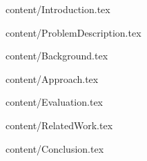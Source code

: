 \documentclass[footsepline,footinclude=false,oneside,fontsize=11pt,paper=a4,listof=totoc,bibliography=totoc]{scrbook} %
\begin{document}
\newpage
\setcounter{page}{1}
\begin{spacing}{1.2}
\hoffset=0mm



\end{spacing}


\tableofcontents

\newpage
\setlength{\baselineskip}{3ex}
\setcounter{page}{1}

\begin{spacing}{1.15}

 {content/Introduction.tex}

 {content/ProblemDescription.tex}

 {content/Background.tex}

 {content/Approach.tex}

 {content/Evaluation.tex}

 {content/RelatedWork.tex}

 {content/Conclusion.tex}


\end{spacing}


\printbibliography{}
\end{document}
